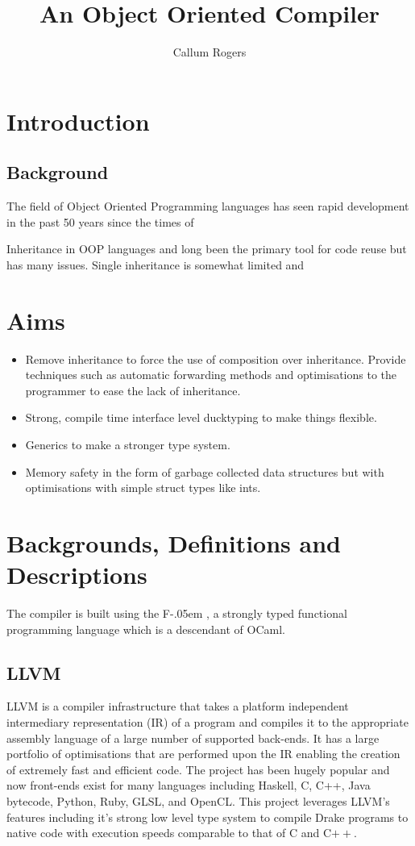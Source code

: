 \documentclass{article}
\newcommand{\sharponend}[1]{{\settoheight{\dimen0}{#1}#1\kern-.05em \resizebox{!}{\dimen0}{\raisebox{\depth}{\fontseries{b}\selectfont\#}}}}
\newcommand{\fsharp}{\sharponend{F}\xspace}
\newcommand*{\cpp}{C\ensuremath{++}\xspace}
\newcommand{\plname}[0]{Drake\xspace}
\begin{document}
\title{An Object Oriented Compiler}
\author{Callum Rogers}
\maketitle
\tableofcontents
\pagebreak

\section{Introduction}
\subsection{Background}
The field of Object Oriented Programming languages has seen rapid development in the past 50 years since the times of 

Inheritance in OOP languages and long been the primary tool for code reuse but has many issues. Single inheritance is somewhat limited and 
\pagebreak

\section{Aims}
\begin{itemize}
	\item{Remove inheritance to force the use of composition over inheritance. Provide techniques such as automatic forwarding methods and optimisations to the programmer to ease the lack of inheritance.}
	\item{Strong, compile time interface level ducktyping to make things flexible.}
	\item{Generics to make a stronger type system.}
	\item{Memory safety in the form of garbage collected data structures but with optimisations with simple struct types like ints.}
\end{itemize}

\section{Backgrounds, Definitions and Descriptions}
The compiler is built using the \fsharp, a strongly typed functional programming language which is a descendant of OCaml. 

\subsection{LLVM}
LLVM is a compiler infrastructure that takes a platform independent intermediary representation (IR) of a program and compiles it to the appropriate assembly language of a large number of supported back-ends. It has a large portfolio of optimisations that are performed upon the IR enabling the creation of extremely fast and efficient code. The project has been hugely popular and now front-ends exist for many languages including Haskell, C, C++, Java bytecode, Python, Ruby, GLSL, and OpenCL. This project leverages LLVM's features including it's strong low level type system to compile \plname{} programs to native code with execution speeds comparable to that of C and \cpp.
\end{document}
